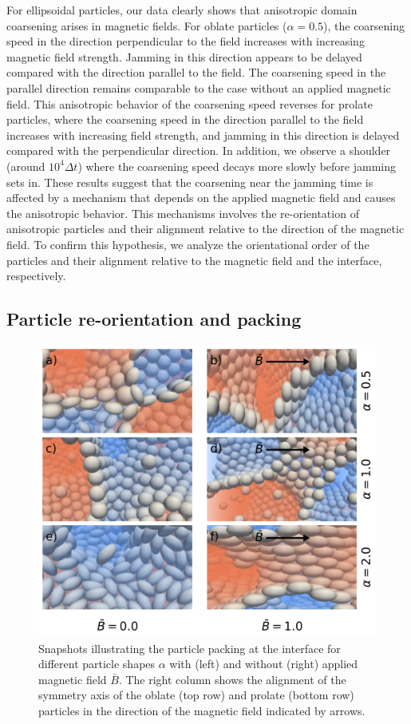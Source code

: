 For ellipsoidal particles, our data clearly shows that an\-isotropic
domain coarsening arises in magnetic fields.  For oblate particles
(\(\alpha=0.5\)), the coarsening speed in the direction perpendicular
to the field increases with increasing magnetic field strength.
Jamming in this direction appears to be delayed compared with the
direction parallel to the field. The coarsening speed in the parallel
direction remains comparable to the case without an applied magnetic
field. This anisotropic behavior of the coarsening speed reverses for
prolate particles, where the coarsening speed in the direction parallel to the field increases with increasing field strength, and jamming in this direction
is delayed compared with the perpendicular direction. In addition, we observe a shoulder (around \(10^4\Delta t\)) where the coarsening speed decays more slowly before jamming sets in. These results suggest that the coarsening near the jamming time is affected by a mechanism that depends on the applied magnetic field and causes the anisotropic
behavior. This mechanisms involves the re-orientation of anisotropic
particles and their alignment relative to the direction of the
magnetic field. To confirm this hypothesis, we analyze the
orientational order of the particles and their alignment relative to
the magnetic field and the interface, respectively.

\subsection{Particle re-orientation and packing}

\begin{figure}
\centering
\includegraphics[width=0.5\columnwidth]{figures/results/paper1/particle_packing_viz.png}
\caption{Snapshots illustrating the particle packing at the interface for different particle shapes $\alpha$ with (left) 
        and without (right) applied magnetic field $\bar{B}$. The right column shows the alignment of the symmetry axis of 
        the oblate (top row) and prolate (bottom row) particles in the direction of the magnetic field indicated by arrows.}
\label{fig:packing_viz}
\end{figure}

